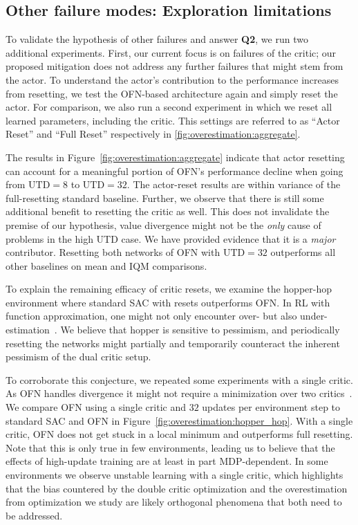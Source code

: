 \subsection{Other failure modes: Exploration limitations} \label{sec:otherfailure}

To validate the hypothesis of other failures and answer \textbf{Q2}, we run two additional experiments. First, our current focus is on failures of the critic; our proposed mitigation does not address any further failures that might stem from the actor. To understand the actor's contribution to the performance increases from resetting, we test the OFN-based architecture again and simply reset the actor.
For comparison, we also run a second experiment in which we reset all learned parameters, including the critic.
This settings are referred to as ``Actor Reset'' and ``Full Reset'' respectively in \autoref{fig:overestimation:aggregate}.

The results in Figure~\ref{fig:overestimation:aggregate} indicate that actor resetting can account for a meaningful portion of OFN's performance decline when going from $\mathrm{UTD}=8$ to $\mathrm{UTD}=32$. The actor-reset results are within variance of the full-resetting standard baseline. Further, we observe that there is still some additional benefit to resetting the critic as well. 
This does not invalidate the premise of our hypothesis, value divergence might not be the \emph{only} cause of problems in the high UTD case. We have provided evidence that it is a \emph{major} contributor.
Resetting both networks of OFN with $\mathrm{UTD}=32$ outperforms all other baselines on mean and IQM comparisons.

To explain the remaining efficacy of critic resets, we examine the hopper-hop environment where standard SAC with resets outperforms OFN. 
In RL with function approximation, one might not only encounter over- but also under-estimation~\parencite{wu2020reducing, lan2020maxmin, saglam2021estimation}.
We believe that hopper is sensitive to pessimism, and periodically resetting the networks might partially and temporarily counteract the inherent pessimism of the dual critic setup.

To corroborate this conjecture, we repeated some experiments with a single critic. As OFN handles divergence it might not require a minimization over two critics~\parencite{fujimoto2018addressing}. We compare OFN using a single critic and $32$ updates per environment step to standard SAC and OFN in Figure~\ref{fig:overestimation:hopper_hop}. With a single critic, OFN does not get stuck in a local minimum and outperforms full resetting. Note that this is only true in few environments, leading us to believe that the effects of high-update training are at least in part MDP-dependent.
In some environments we observe unstable learning with a single critic, which highlights that the bias countered by the double critic optimization and the overestimation from optimization we study are likely orthogonal phenomena that both need to be addressed.

